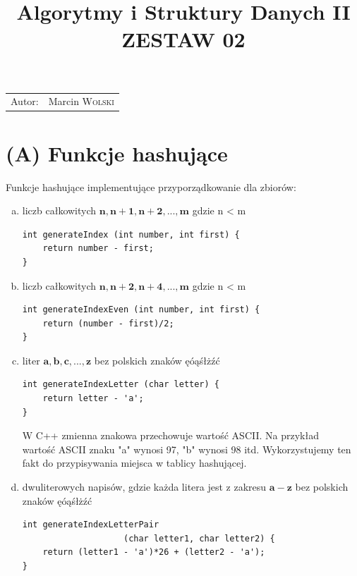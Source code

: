 \documentclass{article}
\title{Algorytmy i Struktury Danych II \\ ZESTAW 02} %
\author{} %
\date{} %
\begin{document}
\maketitle %

\begin{center}
\begin{tabular}{l r}
Autor: & Marcin \textsc{Wolski}
\end{tabular}
\end{center}

\section*{(A) Funkcje hashujące}
Funkcje hashujące implementujące przyporządkowanie dla zbiorów:
\begin{enumerate}[a)] 
    \item liczb całkowitych $\mathbf{n, n+1, n+2, ...,m}$ gdzie n < m 
\begin{lstlisting}
int generateIndex (int number, int first) {
    return number - first;
}
\end{lstlisting}
    \item liczb całkowitych $\mathbf{n, n+2, n+4, ...,m}$ gdzie n < m
\begin{lstlisting}
int generateIndexEven (int number, int first) {
    return (number - first)/2;
}
\end{lstlisting}
    \item liter $\mathbf{a,b,c,...,z}$ bez polskich znaków ęóąśłżźć\\
\begin{lstlisting}
int generateIndexLetter (char letter) {
    return letter - 'a';
}
\end{lstlisting}
W C++ zmienna znakowa przechowuje wartość ASCII. Na przykład\\ wartość ASCII znaku "a" wynosi 97, "b" wynosi 98 itd. Wykorzystujemy ten fakt
do przypisywania miejsca w tablicy hashującej.
    \item dwuliterowych napisów, gdzie każda litera jest z zakresu $\mathbf{a - z}$ bez polskich znaków ęóąśłżźć
\begin{lstlisting}
int generateIndexLetterPair 
                    (char letter1, char letter2) {
    return (letter1 - 'a')*26 + (letter2 - 'a');
}
\end{lstlisting}
\end{enumerate}
\end{document}
